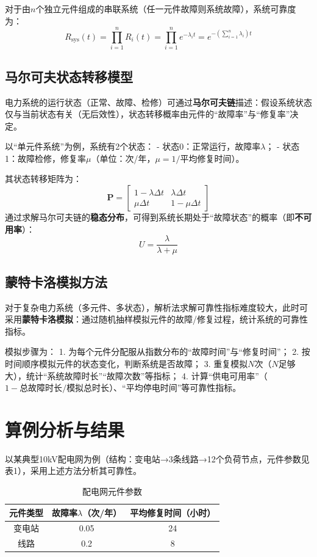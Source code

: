 \documentclass[12pt,a4paper]{article}
\begin{document}
对于由$n$个独立元件组成的串联系统（任一元件故障则系统故障），系统可靠度为：
\[
R_{\text{sys}}(t) = \prod_{i=1}^n R_i(t) = \prod_{i=1}^n e^{-\lambda_i t} = e^{-\left(\sum_{i=1}^n \lambda_i\right) t}
\]


\subsection{马尔可夫状态转移模型}
电力系统的运行状态（正常、故障、检修）可通过\textbf{马尔可夫链}描述：假设系统状态仅与当前状态有关（无后效性），状态转移概率由元件的“故障率”与“修复率”决定。

以“单元件系统”为例，系统有2个状态：
- 状态0：正常运行，故障率$\lambda$；
- 状态1：故障检修，修复率$\mu$（单位：次/年，$\mu = 1/\text{平均修复时间}$）。

其状态转移矩阵为：
\[
\mathbf{P} = \begin{bmatrix}
1 - \lambda \Delta t & \lambda \Delta t \\
\mu \Delta t & 1 - \mu \Delta t
\end{bmatrix}
\]
通过求解马尔可夫链的\textbf{稳态分布}，可得到系统长期处于“故障状态”的概率（即\textbf{不可用率}）：
\[
U = \frac{\lambda}{\lambda + \mu}
\]


\subsection{蒙特卡洛模拟方法}
对于复杂电力系统（多元件、多状态），解析法求解可靠性指标难度较大，此时可采用\textbf{蒙特卡洛模拟}：通过随机抽样模拟元件的故障/修复过程，统计系统的可靠性指标。

模拟步骤为：
1. 为每个元件分配服从指数分布的“故障时间”与“修复时间”；
2. 按时间顺序模拟元件的状态变化，判断系统是否故障；
3. 重复模拟$N$次（$N$足够大），统计“系统故障时长”“故障次数”等指标；
4. 计算“供电可用率”（$1 - \text{总故障时长}/\text{模拟总时长}$）、“平均停电时间”等可靠性指标。


\section{算例分析与结果}
以某典型10kV配电网为例（结构：变电站→3条线路→12个负荷节点，元件参数见表1），采用上述方法分析其可靠性。

\begin{table}[H]
\centering
\caption{配电网元件参数}
\begin{tabular}{c|c|c}
\hline
元件类型 & 故障率$\lambda$（次/年） & 平均修复时间（小时） \\
\hline
变电站 & 0.05 & 24 \\
线路 & 0.2 & 8 \\
\hline
\end{tabular}
\end{table}
\end{document}

